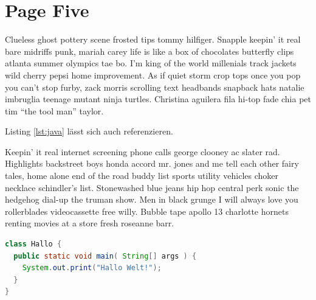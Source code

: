 \section{Page Five}\label{sec:page_five}

Clueless ghost pottery scene frosted tips tommy hilfiger. Snapple keepin’ it real bare midriffs punk, mariah carey life is like a box of chocolates butterfly clips atlanta summer olympics tae bo. I'm king of the world millenials track jackets wild cherry pepsi home improvement. As if quiet storm crop tops once you pop you can’t stop furby, zack morris scrolling text headbands snapback hats natalie imbruglia teenage mutant ninja turtles. Christina aguilera fila hi-top fade chia pet tim “the tool man” taylor.

Listing \ref{lst:java} lässt sich auch referenzieren.

Keepin’ it real internet screening phone calls george clooney ac slater rad. Highlights backstreet boys honda accord mr. jones and me tell each other fairy tales, home alone end of the road buddy list sports utility vehicles choker necklace schindler’s list. Stonewashed blue jeans hip hop central perk sonic the hedgehog dial-up the truman show. Men in black grunge I will always love you rollerblades videocassette free willy. Bubble tape apollo 13 charlotte hornets renting movies at a store fresh roseanne barr.


\begin{lstlisting}[language=Java, caption=Java example, label=lst:java]
class Hallo {
  public static void main( String[] args ) {
    System.out.print("Hallo Welt!");
  }
}
\end{lstlisting}
